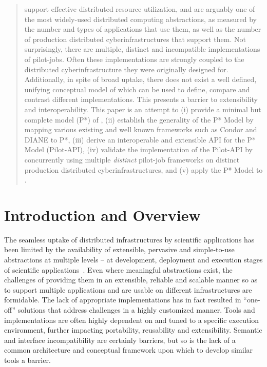\documentclass[conference]{IEEEtran}
\begin{document}
\begin{abstract} 
  \pilotjobs support effective distributed resource utilization, and 
  are arguably one of the most widely-used distributed
  computing abstractions,
  as measured by the number and types of applications that use them,
  as well as the number of production distributed cyberinfrastructures
  that support them.  Not surprisingly, there are multiple, distinct
  and incompatible implementations of pilot-jobs. Often these
  implementations are strongly coupled to the distributed
  cyberinfrastructure they were originally designed for.
  Additionally, in spite of broad uptake, there does not exist a well
  defined, unifying conceptual model of \pilotjobs which can be used
  to define, compare and contrast different implementations. This
  presents a barrier to extensibility and interoperability. This paper
  is an attempt to (i) provide a minimal but complete model (P*) of
  \pilotjobs, (ii) establish the generality of the P* Model by mapping
  various existing and well known \pilotjob frameworks such as Condor
  and DIANE to P*, (iii) derive an interoperable and extensible API
  for the P* Model (Pilot-API), (iv) validate the implementation of
  the Pilot-API by concurrently using multiple {\it distinct}
  pilot-job frameworks on distinct production distributed
  cyberinfrastructures, and (v) apply the P* Model to \pilotdata.
\end{abstract}

\section{Introduction and Overview} 

The seamless uptake of distributed infrastructures by scientific
applications has been limited by the availability of extensible,
pervasive and simple-to-use abstractions at multiple levels -- at
development, deployment and execution stages of scientific
applications~\cite{dpagrid2009}.  Even where meaningful abstractions
exist, the challenges of providing them in an extensible, reliable and
scalable manner so as to support multiple applications and are
usable on different infrastructures are formidable.  The lack of
appropriate implementations has in fact resulted in ``one-off''
solutions that address challenges in a highly customized manner.
Tools and implementations are often highly dependent on and tuned to a
specific execution environment, further impacting portability,
reusability and extensibility.  Semantic and interface incompatibility
are certainly barriers, but so is the lack of a common architecture
and conceptual framework upon which to develop similar tools a
barrier.
\end{document}
